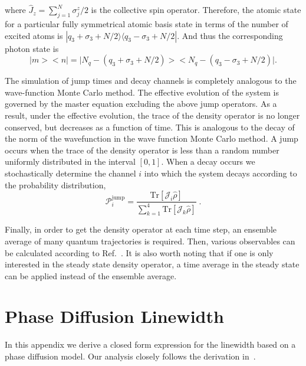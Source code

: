 \documentclass[aps,
twocolumn,
showpacs,
superscriptaddress,groupedaddress]{revtex4}
\begin{document}
where $\hat{J}_z=\sum_{j=1}^N\sigma_j^{z}/2$ is the collective spin
operator.  Therefore, the atomic state for a particular fully
symmetrical atomic basis state in terms of the number of excited atoms
is $|q_3+\sigma_3+N/2\rangle\langle q_3-\sigma_3+N/2|$.  And thus the
corresponding photon state is
\begin{equation}
\bigl|m\bigr>\bigl<n\bigr|=
\bigl|N_q-(q_3+\sigma_3+N/2)\bigr>
\bigl<N_q-(q_3-\sigma_3+N/2)\bigr|.
\end{equation}

The simulation of jump times and decay channels is completely analogous
to the wave-function Monte Carlo method. The effective evolution of the
system is governed by the master equation excluding the above jump
operators. As a result, under the effective evolution, the trace of the
density operator is no longer conserved, but decreases as a function of
time.  This is analogous to the decay of the norm of the wavefunction in
the wave function Monte Carlo method. A jump occurs when the trace of
the density operator is less than a random number uniformly distributed
in the interval $[0,1]$. When a decay occurs we stochastically determine
the channel $i$ into which the system decays according to the
probability distribution,
\begin{equation}
\mathcal{P}_i^{\mathrm{jump}}=
\frac{\mathrm{Tr}[\mathcal{J}_i\hat{\rho}]}
{\sum_{k=1}^4 \mathrm{Tr}[\mathcal{J}_k\hat{\rho}]}\;.
\end{equation}

Finally, in order to get the density operator at each time step, an
ensemble average of many quantum trajectories is required. Then, various
observables can be calculated according to
Ref.~\cite{PhysRevA.87.062101}. It is also worth noting that if one is
only interested in the steady state density operator, a time average in
the steady state can be applied instead of the ensemble average.


\section{Phase Diffusion Linewidth}
\label{HakenAppendix}

In this appendix we derive a closed form expression for the linewidth
based on a phase diffusion model.  Our analysis closely follows the
derivation in~\cite{HakenLaser, HakenLaserBook}.
\end{document}
